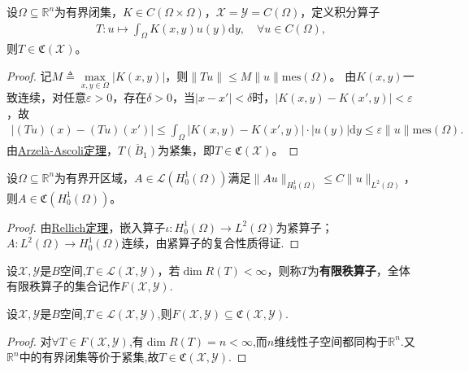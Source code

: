 \documentclass[../../main.tex]{subfiles}%
\begin{document}
\begin{example}
设$\Omega\subseteq\mathbb{R}^n$为有界闭集，$K\in C(\Omega\times\Omega)$，$\mathscr{X}=\mathscr{Y}=C(\Omega)$，定义积分算子
\begin{align*}
T:u\mapsto\int_{\Omega}K(x,y)u(y)\mathrm{d}y,\quad \forall u\in C(\Omega),
\end{align*}
则$T\in\mathfrak{C}(\mathscr{X})$。
\end{example}
\begin{proof}
记$M\triangleq\max\limits_{x,y\in\Omega}|K(x,y)|$，则$\|Tu\|\leqslant M\|u\|\mathrm{mes}(\Omega)$。
由$K(x,y)$一致连续，对任意$\varepsilon>0$，存在$\delta>0$，当$|x-x'|<\delta$时，$|K(x,y)-K(x',y)|<\varepsilon$，故
\begin{align*}
|(Tu)(x)-(Tu)(x')|\leqslant\int_{\Omega}|K(x,y)-K(x',y)|\cdot|u(y)|\mathrm{d}y\leqslant\varepsilon\|u\|\mathrm{mes}(\Omega).
\end{align*}
由\hyperref[theorem:泛函分析--Arzelà-Ascoli定理]{Arzelà-Ascoli定理}，$\overline{T(B_1)}$为紧集，即$T\in\mathfrak{C}(\mathscr{X})$。
\end{proof}

\begin{example}
设$\Omega\subseteq\mathbb{R}^n$为有界开区域，$A\in\mathscr{L}(H_0^1(\Omega))$满足$\|Au\|_{H_0^1(\Omega)}\leqslant C\|u\|_{L^2(\Omega)}$，则$A\in\mathfrak{C}(H_0^1(\Omega))$。
\end{example}
\begin{proof}
由\hyperref[theorem:Rellich定理]{Rellich定理}，嵌入算子$\iota:H_0^1(\Omega)\to L^2(\Omega)$为紧算子；$A:L^2(\Omega)\to H_0^1(\Omega)$连续，由紧算子的复合性质得证.
\end{proof}

\begin{definition}[有限秩算子]
设$\mathscr{X},\mathscr{Y}$是$B$空间,$T\in\mathscr{L}(\mathscr{X},\mathscr{Y})$，若$\dim R(T)<\infty$，则称$T$为\textbf{有限秩算子}，全体有限秩算子的集合记作$F(\mathscr{X},\mathscr{Y})$.
\end{definition}

\begin{proposition}
设$\mathscr{X},\mathscr{Y}$是$B$空间,$T\in\mathscr{L}(\mathscr{X},\mathscr{Y})$,则$F(\mathscr{X},\mathscr{Y})\subseteq\mathfrak{C}(\mathscr{X},\mathscr{Y})$.
\end{proposition}
\begin{proof}
对$\forall T\in F(\mathscr{X},\mathscr{Y})$,有$\dim R(T)=n<\infty$,而$n$维线性子空间都同构于$\mathbb{R}^n$.又$\mathbb{R}^n$中的有界闭集等价于紧集,故$T\in \mathfrak{C}(\mathscr{X},\mathscr{Y})$.
\end{proof}
\end{document}
